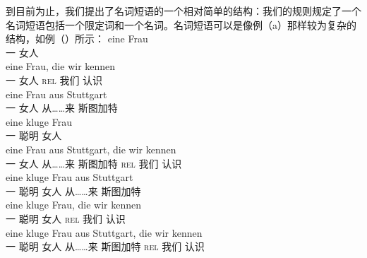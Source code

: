 到目前为止，我们提出了名词短语的一个相对简单的结构：我们的规则规定了一个名词短语包括一个限定词和一个名词。名词短语可以是像例（a）那样较为复杂的结构，如例（）所示：
\eal
\label{Beispiele-NP-Adjunkte}
\ex 
\gll eine Frau\\
	 一 女人\\
\ex 
\gll eine Frau, die wir kennen\\
	 一 女人 \textsc{rel} 我们 认识\\
\ex 
\gll eine Frau aus Stuttgart\\
	 一 女人 从……来 斯图加特\\
\ex 
\gll eine kluge Frau\\
	 一 聪明 女人\\
\ex 
\gll eine Frau aus Stuttgart, die wir kennen\\
	 一 女人 从……来 斯图加特 \textsc{rel} 我们 认识\\
\ex 
\gll eine kluge Frau aus Stuttgart\\
	 一 聪明 女人 从……来 斯图加特\\
\ex 
\gll eine kluge Frau, die wir kennen\\
	 一 聪明 女人 \textsc{rel} 我们 认识\\
\ex 
\gll eine kluge Frau aus Stuttgart, die wir kennen\\
	 一 聪明 女人 从……来 斯图加特 \textsc{rel} 我们 认识\\
\zl

